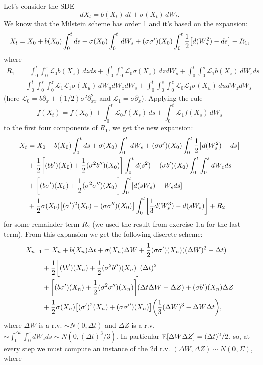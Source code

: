\documentclass[a4paper,11pt]{article}
\theoremstyle{definition}
\theoremstyle{plain}
\theoremstyle{remark}
\DeclarePairedDelimiter{\parr}{(}{)}
\DeclarePairedDelimiter{\parq}{[}{]}
\DeclareMathOperator*{\expval}{\mathbb{E}}
\begin{document}
Let's consider the SDE
$$
dX_t = b(X_t)\,dt + \sigma(X_t)\,dW_t.
$$
We know that the Milstein scheme has order 1 and it's based on the expansion:
$$
X_t = X_0 + b(X_0)\int_0^tds + \sigma(X_0)\int_0^t\,dW_s + (\sigma\sigma')(X_0)\int_0^t\frac{1}{2}\parq*{d(W^2_s) - ds}  + R_1,
$$
where
\begin{align*}
R_1 & = \int_0^t\int_0^s\mathcal{L}_0b(X_z)\,dzds + \int_0^t\int_0^s\mathcal{L}_0\sigma(X_z)\,dzdW_s + \int_0^t\int_0^s\mathcal{L}_1b(X_z)\,dW_zds \\ &  + \int_0^t\int_0^s\int_0^z\mathcal{L}_1\mathcal{L}_1\sigma(X_u)\,dW_udW_zdW_s + \int_0^t\int_0^s\int_0^z\mathcal{L}_0\mathcal{L}_1\sigma(X_u)\,dudW_zdW_s 
\end{align*}
(here $\mathcal{L}_0=b\partial_x+(1/2)\sigma^2\partial^2_{xx}$ and $\mathcal{L}_1=\sigma\partial_x$). Applying the rule
$$
f(X_t) = f(X_0) + \int_0^t\mathcal{L}_0f(X_s)\,ds + \int_0^t\mathcal{L}_1f(X_s)\,dW_s
$$
to the first four components of $R_1$, we get the new expansion:
\begin{align*}
X_t & = X_0 + b(X_0)\int_0^tds + \sigma(X_0)\int_0^t\,dW_s + (\sigma\sigma')(X_0)\int_0^t\frac{1}{2}\parq*{d(W^2_s) - ds} \\ & + \frac{1}{2}\parq*{(bb')(X_0) + \frac{1}{2}(\sigma^2b'')(X_0)}\int_0^td(s^2) + (\sigma b')(X_0)\int_0^t\int_0^sdW_zds \\ & + \parq*{(b\sigma')(X_0) +\frac{1}{2}(\sigma^2\sigma'')(X_0)}\int_0^t\parq*{d(sW_s)-W_sds} \\ & + \frac{1}{2}\sigma(X_0)\parq*{(\sigma')^2(X_0)+(\sigma\sigma'')(X_0)}\int_0^t\parq*{\frac{1}{3}d(W_s^3)-d(sW_s)} + R_2
\end{align*}
for some remainder term $R_2$ (we used the result from exercise 1.a for the last term). From this expansion we get the following discrete scheme:
\begin{align*}
X_{n+1} & = X_n + b(X_n)\Delta t + \sigma(X_n)\Delta W + \frac{1}{2}(\sigma\sigma')(X_n)((\Delta W)^2-\Delta t) \\ & + \frac{1}{2}\parq*{(bb')(X_n) + \frac{1}{2}(\sigma^2b'')(X_n)}(\Delta t)^2 \\ & + \parq*{(b\sigma')(X_n) +\frac{1}{2}(\sigma^2\sigma'')(X_n)}(\Delta t\Delta W -\Delta Z)  + (\sigma b')(X_n)\Delta Z \\ & + \frac{1}{2}\sigma(X_n)\parq*{(\sigma')^2(X_n)+(\sigma\sigma'')(X_n)}\parr*{\frac{1}{3}(\Delta W)^3-\Delta W\Delta t},
\end{align*} 
where $\Delta W$ is a r.v. $\sim N(0,\Delta t)$ and $\Delta Z$ is a r.v. $\sim\int_0^{\Delta t}\int_0^sdW_zds\sim N(0,(\Delta t)^3/3)$. In particular $\expval\parq{\Delta W\Delta Z} = (\Delta t)^2/2$, so, at every step we must compute an instance of the 2d r.v. $(\Delta W, \Delta Z)\sim N(\mathbf{0},\Sigma)$, where
\end{document}
